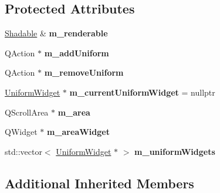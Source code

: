 \subsection*{Protected Attributes}
\begin{DoxyCompactItemize}
\item 
\mbox{\label{classrev_1_1_view_1_1_render_uniforms_widget_a124b04de39ed9788612201355aefd594}} 
\mbox{\hyperlink{classrev_1_1_shadable}{Shadable}} \& {\bfseries m\+\_\+renderable}
\item 
\mbox{\label{classrev_1_1_view_1_1_render_uniforms_widget_a0d051a8205ec3239609132edad7adf9a}} 
Q\+Action $\ast$ {\bfseries m\+\_\+add\+Uniform}
\item 
\mbox{\label{classrev_1_1_view_1_1_render_uniforms_widget_a0039e02673772994d1c91bf5a6a9708a}} 
Q\+Action $\ast$ {\bfseries m\+\_\+remove\+Uniform}
\item 
\mbox{\label{classrev_1_1_view_1_1_render_uniforms_widget_ab72aeb902b54f6ca95a50ede9f4d7763}} 
\mbox{\hyperlink{classrev_1_1_view_1_1_uniform_widget}{Uniform\+Widget}} $\ast$ {\bfseries m\+\_\+current\+Uniform\+Widget} = nullptr
\item 
\mbox{\label{classrev_1_1_view_1_1_render_uniforms_widget_a3b4906b6b3b2f1fda250b3a3ac354eff}} 
Q\+Scroll\+Area $\ast$ {\bfseries m\+\_\+area}
\item 
\mbox{\label{classrev_1_1_view_1_1_render_uniforms_widget_a7aff1dec8d4cdb83d6d83c93289532d4}} 
Q\+Widget $\ast$ {\bfseries m\+\_\+area\+Widget}
\item 
\mbox{\label{classrev_1_1_view_1_1_render_uniforms_widget_a7d7cd2e7b38571fba7e587276c1587ed}} 
std\+::vector$<$ \mbox{\hyperlink{classrev_1_1_view_1_1_uniform_widget}{Uniform\+Widget}} $\ast$ $>$ {\bfseries m\+\_\+uniform\+Widgets}
\end{DoxyCompactItemize}
\subsection*{Additional Inherited Members}


